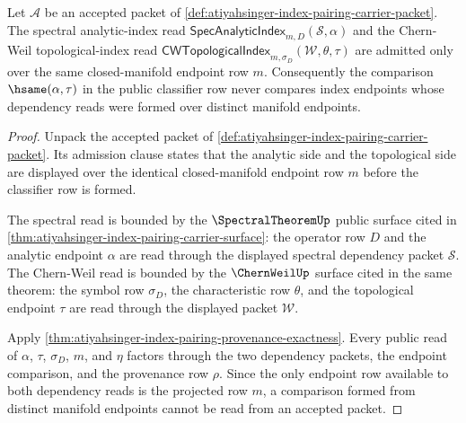 \begin{theorem}
\label{thm:atiyahsinger-shared-index-source-boundary}
Let $\mathcal{A}$ be an accepted packet of
\autoref{def:atiyahsinger-index-pairing-carrier-packet}. The spectral
analytic-index read $\mathsf{SpecAnalyticIndex}_{m,D}(\mathcal{S},\alpha)$
and the Chern-Weil topological-index read
$\mathsf{CWTopologicalIndex}_{m,\sigma_D}(\mathcal{W},\theta,\tau)$ are
admitted only over the same closed-manifold endpoint row $m$. Consequently the
comparison $\hsame(\alpha,\tau)$ in the public classifier row never compares
index endpoints whose dependency reads were formed over distinct manifold
endpoints.
\end{theorem}
\begin{proof}
Unpack the accepted packet of
\autoref{def:atiyahsinger-index-pairing-carrier-packet}. Its admission clause
states that the analytic side and the topological side are displayed over the
identical closed-manifold endpoint row $m$ before the classifier row is formed.

The spectral read is bounded by the $\SpectralTheoremUp$ public surface cited
in \autoref{thm:atiyahsinger-index-pairing-carrier-surface}: the operator row
$D$ and the analytic endpoint $\alpha$ are read through the displayed spectral
dependency packet $\mathcal{S}$. The Chern-Weil read is bounded by the
$\ChernWeilUp$ surface cited in the same theorem: the symbol row $\sigma_D$,
the characteristic row $\theta$, and the topological endpoint $\tau$ are read
through the displayed packet $\mathcal{W}$.

Apply \autoref{thm:atiyahsinger-index-pairing-provenance-exactness}. Every
public read of $\alpha$, $\tau$, $\sigma_D$, $m$, and $\eta$ factors through
the two dependency packets, the endpoint comparison, and the provenance row
$\rho$. Since the only endpoint row available to both dependency reads is the
projected row $m$, a comparison formed from distinct manifold endpoints cannot
be read from an accepted packet.
\end{proof}


